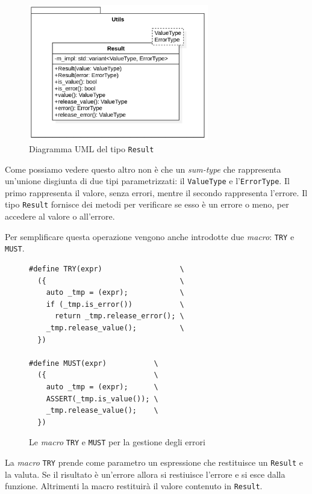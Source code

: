 \begin{figure}[H]
	\centering
	\includegraphics[width=0.7\textwidth]{figures/result.png}
	\caption{Diagramma UML del tipo \texttt{Result}}
	\label{fig:result-uml}
\end{figure}

Come possiamo vedere questo altro non \`e che un \textit{sum-type} che rappresenta un'unione disgiunta di due tipi parametrizzati: il \texttt{ValueType} e l'\texttt{ErrorType}. Il primo rappresenta il valore, senza errori, mentre il secondo rappresenta l'errore. Il tipo \texttt{Result} fornisce dei metodi per verificare se esso \`e un errore o meno, per accedere al valore o all'errore.

Per semplificare questa operazione vengono anche introdotte due \textit{macro}: \texttt{TRY} e \texttt{MUST}.

\begin{figure}[H]
	\centering
	\begin{verbatim}
#define TRY(expr)                  \
  ({                               \
    auto _tmp = (expr);            \
    if (_tmp.is_error())           \
      return _tmp.release_error(); \
    _tmp.release_value();          \
  })

#define MUST(expr)           \
  ({                         \
    auto _tmp = (expr);      \
    ASSERT(_tmp.is_value()); \
    _tmp.release_value();    \
  })
	\end{verbatim}
	\label{fig:result-macros}
	\caption{Le \textit{macro} \texttt{TRY} e \texttt{MUST} per la gestione degli errori}
\end{figure}

La \textit{macro} \texttt{TRY} prende come parametro un espressione che restituisce un \texttt{Result} e la valuta. Se il risultato \`e un'errore allora si restiuisce l'errore e si esce dalla funzione. Altrimenti la macro restituir\`a il valore contenuto in \texttt{Result}.

